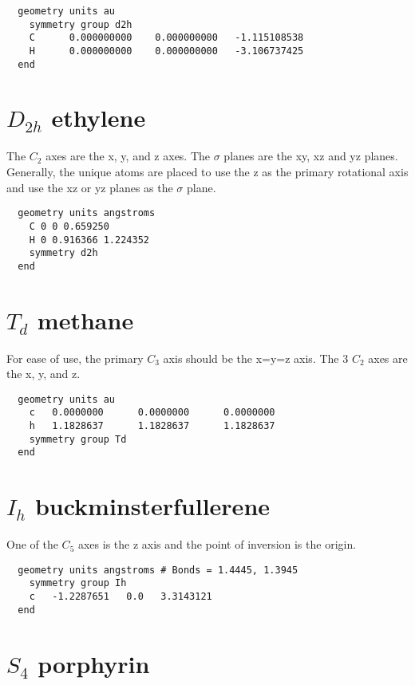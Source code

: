 \begin{verbatim}
  geometry units au
    symmetry group d2h
    C      0.000000000    0.000000000   -1.115108538
    H      0.000000000    0.000000000   -3.106737425
  end
\end{verbatim}

  \section{\protect$D_{2h}$ ethylene}

The $C_2$ axes are the x, y, and z axes.  The $\sigma$ planes are the xy,
xz and yz planes.  Generally, the unique atoms are placed to use the z
as the primary rotational axis and use the xz or yz planes as the $\sigma$ 
plane.

\begin{verbatim}
  geometry units angstroms
    C 0 0 0.659250 
    H 0 0.916366 1.224352 
    symmetry d2h
  end
\end{verbatim}


  \section{\protect$T_d$ methane}

For ease of use, the primary $C_3$ axis should be the x=y=z axis.
The 3 $C_2$ axes are the x, y, and z.

\begin{verbatim}
  geometry units au
    c   0.0000000      0.0000000      0.0000000
    h   1.1828637      1.1828637      1.1828637
    symmetry group Td
  end
\end{verbatim}

  \section{\protect$I_h$ buckminsterfullerene}

One of the $C_5$ axes is the z axis and the point of inversion is the origin.

\begin{verbatim}
  geometry units angstroms # Bonds = 1.4445, 1.3945
    symmetry group Ih
    c   -1.2287651   0.0   3.3143121
  end
\end{verbatim}

  \section{\protect$S_4$ porphyrin}

